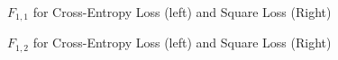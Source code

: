 \documentclass[fleqn]{article}
\begin{document}
\begin{figure}[H]
    \centering
    \qquad
    \caption{$F_{1,1}$ for Cross-Entropy Loss (left) and Square Loss (Right)}
    \label{fig:error_plot_1_v2}
\end{figure}
\begin{figure}[H]
    \centering
    \qquad
    \caption{$F_{1,2}$ for Cross-Entropy Loss (left) and Square Loss (Right)}
    \label{fig:error_plot_2}
\end{figure}
\end{document}
